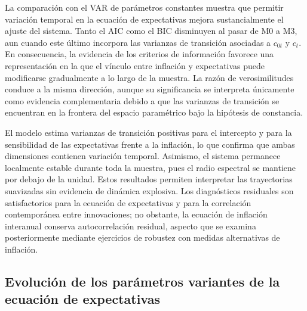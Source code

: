 \documentclass[
  spanish,
  letterpaper,
  DIV=11,
  numbers=noendperiod]{scrartcl}
\begin{document}
La comparación con el VAR de parámetros constantes muestra que permitir
variación temporal en la ecuación de expectativas mejora sustancialmente
el ajuste del sistema. Tanto el AIC como el BIC disminuyen al pasar de
M0 a M3, aun cuando este último incorpora las varianzas de transición
asociadas a \(c_{0t}\) y \(c_t\). En consecuencia, la evidencia de los
criterios de información favorece una representación en la que el
vínculo entre inflación y expectativas puede modificarse gradualmente a
lo largo de la muestra. La razón de verosimilitudes conduce a la misma
dirección, aunque su significancia se interpreta únicamente como
evidencia complementaria debido a que las varianzas de transición se
encuentran en la frontera del espacio paramétrico bajo la hipótesis de
constancia.

El modelo estima varianzas de transición positivas para el intercepto y
para la sensibilidad de las expectativas frente a la inflación, lo que
confirma que ambas dimensiones contienen variación temporal. Asimismo,
el sistema permanece localmente estable durante toda la muestra, pues el
radio espectral se mantiene por debajo de la unidad. Estos resultados
permiten interpretar las trayectorias suavizadas sin evidencia de
dinámica explosiva. Los diagnósticos residuales son satisfactorios para
la ecuación de expectativas y para la correlación contemporánea entre
innovaciones; no obstante, la ecuación de inflación interanual conserva
autocorrelación residual, aspecto que se examina posteriormente mediante
ejercicios de robustez con medidas alternativas de inflación.

\subsection{Evolución de los parámetros variantes de la ecuación de
expectativas}\label{evoluciuxf3n-de-los-paruxe1metros-variantes-de-la-ecuaciuxf3n-de-expectativas}
\end{document}

